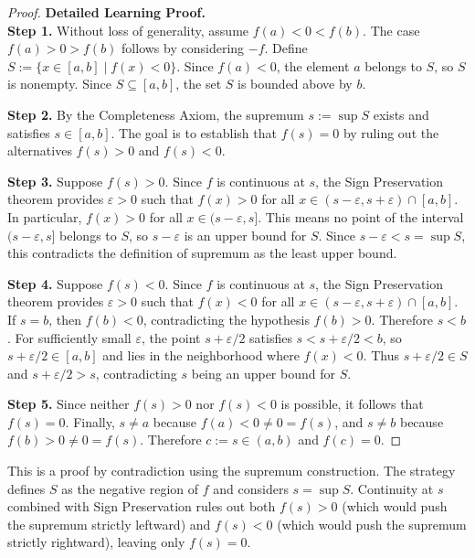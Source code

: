 \begin{proof}
\textbf{Detailed Learning Proof.}~\\

\textbf{Step 1.} Without loss of generality, assume $f(a) < 0 < f(b)$. The case $f(a) > 0 > f(b)$ follows by considering $-f$. Define $S := \{ x \in [a,b] \mid f(x) < 0 \}$. Since $f(a) < 0$, the element $a$ belongs to $S$, so $S$ is nonempty. Since $S \subseteq [a,b]$, the set $S$ is bounded above by $b$.

\textbf{Step 2.} By the Completeness Axiom, the supremum $s := \sup S$ exists and satisfies $s \in [a,b]$. The goal is to establish that $f(s) = 0$ by ruling out the alternatives $f(s) > 0$ and $f(s) < 0$.

\textbf{Step 3.} Suppose $f(s) > 0$. Since $f$ is continuous at $s$, the Sign Preservation theorem provides $\varepsilon > 0$ such that $f(x) > 0$ for all $x \in (s - \varepsilon, s + \varepsilon) \cap [a,b]$. In particular, $f(x) > 0$ for all $x \in (s - \varepsilon, s]$. This means no point of the interval $(s - \varepsilon, s]$ belongs to $S$, so $s - \varepsilon$ is an upper bound for $S$. Since $s - \varepsilon < s = \sup S$, this contradicts the definition of supremum as the least upper bound.

\textbf{Step 4.} Suppose $f(s) < 0$. Since $f$ is continuous at $s$, the Sign Preservation theorem provides $\varepsilon > 0$ such that $f(x) < 0$ for all $x \in (s - \varepsilon, s + \varepsilon) \cap [a,b]$. If $s = b$, then $f(b) < 0$, contradicting the hypothesis $f(b) > 0$. Therefore $s < b$. For sufficiently small $\varepsilon$, the point $s + \varepsilon/2$ satisfies $s < s + \varepsilon/2 < b$, so $s + \varepsilon/2 \in [a,b]$ and lies in the neighborhood where $f(x) < 0$. Thus $s + \varepsilon/2 \in S$ and $s + \varepsilon/2 > s$, contradicting $s$ being an upper bound for $S$.

\textbf{Step 5.} Since neither $f(s) > 0$ nor $f(s) < 0$ is possible, it follows that $f(s) = 0$. Finally, $s \neq a$ because $f(a) < 0 \neq 0 = f(s)$, and $s \neq b$ because $f(b) > 0 \neq 0 = f(s)$. Therefore $c := s \in (a,b)$ and $f(c) = 0$.
\end{proof}

\begin{remark*}
This is a proof by contradiction using the supremum construction. The strategy defines $S$ as the negative region of $f$ and considers $s = \sup S$. Continuity at $s$ combined with Sign Preservation rules out both $f(s) > 0$ (which would push the supremum strictly leftward) and $f(s) < 0$ (which would push the supremum strictly rightward), leaving only $f(s) = 0$.
\end{remark*}

